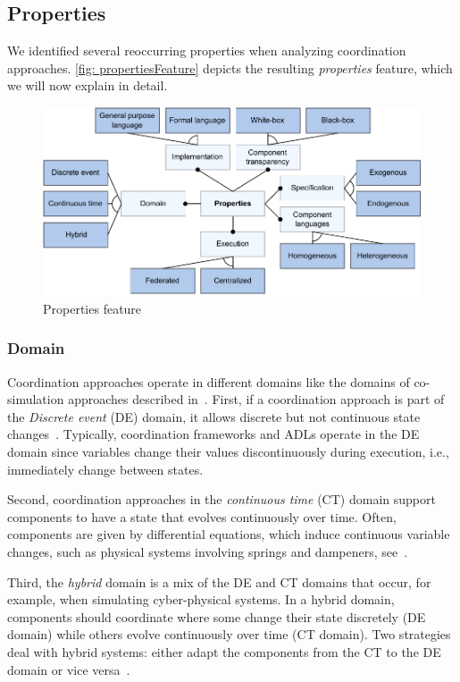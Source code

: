 \documentclass[runningheads]{llncs}
\begin{document}
\subsection{Properties}
We identified several reoccurring properties when analyzing coordination approaches.
\autoref{fig: propertiesFeature} depicts the resulting \textit{properties} feature, which we will now explain in detail.

\begin{figure}[ht]
	\centering
	\includegraphics[width=1\textwidth]{images/properties_feature}
	\caption{Properties feature}
	\label{fig: propertiesFeature}
\end{figure}

\subsubsection{Domain} Coordination approaches operate in different domains like the domains of co-simulation approaches described in~\cite{gomesCoSimulationSurvey2019}.
First, if a coordination approach is part of the \textit{Discrete event} (DE) domain, it allows discrete but not continuous state changes~\cite{gomesCoSimulationSurvey2019}.
Typically, coordination frameworks and ADLs operate in the DE domain since variables change their values discontinuously during execution, i.e., immediately change between states.

Second, coordination approaches in the \textit{continuous time} (CT) domain support components to have a state that evolves continuously over time.
Often, components are given by differential equations, which induce continuous variable changes, such as physical systems involving springs and dampeners, see~\cite{gomesCoSimulationSurvey2019}.

Third, the \textit{hybrid} domain is a mix of the DE and CT domains that occur, for example, when simulating cyber-physical systems.
In a hybrid domain, components should coordinate where some change their state discretely (DE domain) while others evolve continuously over time (CT domain).
Two strategies deal with hybrid systems: either adapt the components from the CT to the DE domain or vice versa~\cite{gomesCoSimulationSurvey2019}.
\end{document}
